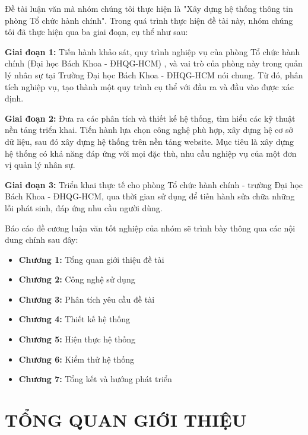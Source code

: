 \documentclass[12pt, a4paper]{report}
\begin{document}
\begin{sumary}
    Đề tài luận văn mà nhóm chúng tôi thực hiện là "Xây dựng hệ thống thông tin phòng Tổ chức hành chính". Trong quá trình thực hiện đề tài này, nhóm chúng tôi đã thực hiện qua ba giai đoạn, cụ thể như sau:

\textbf{Giai đoạn 1: } Tiến hành khảo sát, quy trình nghiệp vụ của phòng Tổ chức hành chính (Đại học Bách Khoa - ĐHQG-HCM) , và vai trò của phòng này trong quản lý nhân sự tại Trường Đại học Bách Khoa - ĐHQG-HCM nói chung. Từ đó, phân tích nghiệp vụ, tạo thành một quy trình cụ thể với đầu ra và đầu vào được xác định.

\textbf{Giai đoạn 2: } Đưa ra các phân tích và thiết kế hệ thống, tìm hiểu các kỹ thuật nền tảng triển khai. Tiến hành lựa chọn công nghệ phù hợp, xây dựng hệ cơ sở dữ liệu, sau đó xây dựng hệ thống trên nền tảng website. Mục tiêu là xây dựng hệ thống có khả năng đáp ứng với mọi đặc thù, nhu cầu nghiệp vụ của một đơn vị quản lý nhân sự.

\textbf{Giai đoạn 3: } Triển khai thực tế cho phòng Tổ chức hành chính - trường Đại học Bách Khoa - ĐHQG-HCM, qua thời gian sử dụng để tiến hành sửa chữa những lỗi phát sinh, đáp ứng nhu cầu người dùng.

    Báo cáo đề cương luận văn tốt nghiệp của nhóm sẽ trình bày thông qua các nội dung chính sau đây:
    \begin{itemize}
        \item \textbf{Chương 1:} Tổng quan giới thiệu đề tài
        \item \textbf{Chương 2:} Công nghệ sử dụng
        \item \textbf{Chương 3:} Phân tích yêu cầu đề tài
        \item \textbf{Chương 4:} Thiết kế hệ thống
        \item \textbf{Chương 5:} Hiện thực hệ thống
        \item \textbf{Chương 6:} Kiểm thử hệ thống
        \item \textbf{Chương 7:} Tổng kết và hướng phát triển
    \end{itemize}
\end{sumary}
\tableofcontents
\newpage
\listoffigures
\newpage
\listoftables
\newpage

\chapter{\textbf{TỔNG QUAN GIỚI THIỆU }}
\newpage

\newpage
\end{document}
